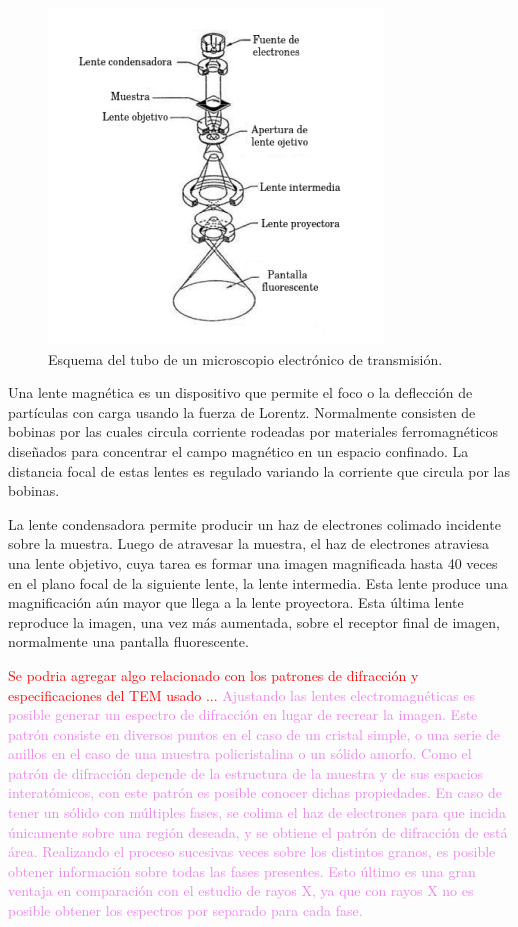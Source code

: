 \documentclass[12pt]{article}
\theoremstyle{definition}
\theoremstyle{remark}
\begin{document}
{ \begin{figure}[H]
 	\centering
	\includegraphics[scale=0.9]{img/TEM.png}
 	\caption{Esquema del tubo de un microscopio electrónico de transmisión.}
	\label{TEM}
\end{figure} 

Una lente magnética es un dispositivo que permite el foco o la deflección de partículas con carga usando la fuerza de Lorentz. Normalmente consisten de bobinas por las cuales circula corriente rodeadas por materiales ferromagnéticos diseñados para concentrar el campo magnético en un espacio confinado. La distancia focal de estas lentes es regulado variando la corriente que circula por las bobinas.

La lente condensadora permite producir un haz de electrones colimado incidente sobre la muestra. Luego de atravesar la muestra, el haz de electrones atraviesa una lente objetivo, cuya tarea es formar una imagen magnificada hasta 40 veces en el plano focal de la siguiente lente, la lente intermedia. Esta lente produce una magnificación aún mayor que llega a la lente proyectora. Esta última lente reproduce la imagen, una vez más aumentada, sobre el receptor final de imagen, normalmente una pantalla fluorescente.

\textcolor{red}{Se podria agregar algo relacionado con los patrones de difracción y especificaciones del TEM usado ...} 
\textcolor{violet}{Ajustando las lentes electromagnéticas es posible generar un espectro de difracción en lugar de recrear la imagen. Este patrón consiste en diversos puntos en el caso de un cristal simple, o una serie de anillos en el caso de una muestra policristalina o un sólido amorfo. Como el patrón de difracción depende de la estructura de la muestra y de sus espacios interatómicos, con este patrón es posible conocer dichas propiedades. En caso de tener un sólido con múltiples fases, se colima el haz de electrones para que incida únicamente sobre una región deseada, y se obtiene el patrón de difracción de está área. Realizando el proceso sucesivas veces sobre los distintos granos, es posible obtener información sobre todas las fases presentes. Esto último es una gran ventaja en comparación con el estudio de rayos X, ya que con rayos X no es posible obtener los espectros por separado para cada fase.}


}
\end{document}
